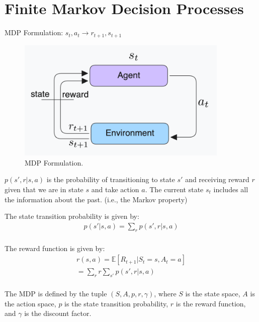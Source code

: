 \section{Finite Markov Decision Processes}

MDP Formulation: $ s_t, a_t \to r_{t+1}, s_{t+1} $

\begin{figure}[h]
    \centering
    \includegraphics[width=0.9\textwidth]{img/mdp_setting.png}
    \caption{MDP Formulation.}
    \label{fig:mdp}
\end{figure}

$p(s', r | s, a)$ is the probability of transitioning to state $s'$ and receiving reward $r$
given that we are in state $s$ and take action $a$. The current state $s_t$ includes all the
information about the past. (i.e., the Markov property)

The state transition probability is given by:
 \begin{equation}
    \begin{split}
        p(s'|s, a) = \sum_{r} p(s', r | s, a) \\
        \label{eq:mdp-transition-probability}
    \end{split}
 \end{equation}

The reward function is given by:
 \begin{equation}
    \begin{split}
        r(s, a) = \mathbb{E}[R_{t+1} | S_t = s, A_t = a] \\
        = \sum_{r} r \sum_{s'} p(s',r|s, a) \\
        \label{eq:mdp-reward-function}
    \end{split}
 \end{equation}

The MDP is defined by the tuple $(S, A, p, r, \gamma)$, where $S$ is the state space, $A$ is the
action space, $p$ is the state transition probability, $r$ is the reward function, and $\gamma$
is the discount factor.

